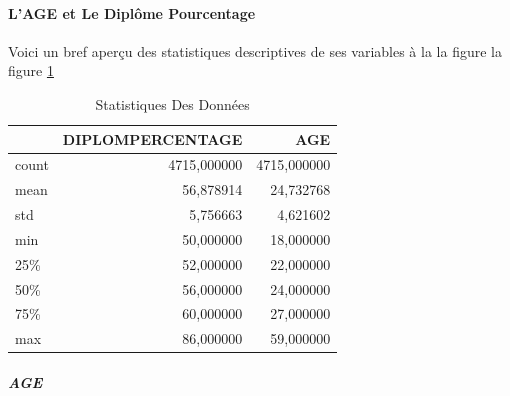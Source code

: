 \paragraph{L'AGE et Le Diplôme Pourcentage}
Voici un bref aperçu des statistiques descriptives de ses variables  à la la figure la figure \ref{tab:DescribeData}
\begin{table}
	\centering
	\begingroup %
	\captionsetup{type=table} %
	\caption{Statistiques Des Données }
	\label{tab:DescribeData}
	\begin{tabular}{lrr}
		\toprule
		{} &  DIPLOMPERCENTAGE &          AGE \\
		\midrule
		count &       4715,000000 &  4715,000000 \\
		mean  &         56,878914 &    24,732768 \\
		std   &          5,756663 &     4,621602 \\
		min   &         50,000000 &    18,000000 \\
		25\%   &         52,000000 &    22,000000 \\
		50\%   &         56,000000 &    24,000000 \\
		75\%   &         60,000000 &    27,000000 \\
		max   &         86,000000 &    59,000000 \\
		\bottomrule
	\end{tabular}
\endgroup
\end{table}
\subparagraph{AGE}

